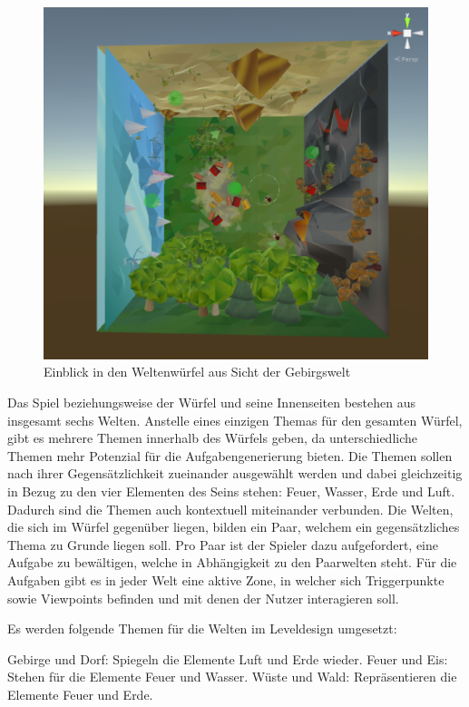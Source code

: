 
\begin{figure}[ht]%
	\centering
		\includegraphics[width=1.0\textwidth]{images/worlds}
	\caption{Einblick in den Weltenwürfel aus Sicht der Gebirgswelt}
	\label{fig:Worlds}
\end{figure}

Das Spiel beziehungsweise der Würfel und seine Innenseiten bestehen aus insgesamt sechs Welten. Anstelle eines einzigen Themas für den gesamten Würfel, gibt es mehrere Themen innerhalb des Würfels geben, da unterschiedliche Themen mehr Potenzial für die Aufgabengenerierung bieten. Die Themen sollen nach ihrer Gegensätzlichkeit zueinander ausgewählt werden und dabei gleichzeitig in Bezug zu den vier Elementen des Seins stehen: Feuer, Wasser, Erde und Luft. Dadurch sind die Themen auch kontextuell miteinander verbunden. Die Welten, die sich im Würfel gegenüber liegen, bilden ein Paar, welchem ein gegensätzliches Thema zu Grunde liegen soll. Pro Paar ist der Spieler dazu aufgefordert, eine Aufgabe zu bewältigen, welche in Abhängigkeit zu den Paarwelten steht. Für die Aufgaben gibt es in jeder Welt eine aktive Zone, in welcher sich Triggerpunkte sowie Viewpoints befinden und mit denen der Nutzer interagieren soll.

Es werden folgende Themen für die Welten im Leveldesign umgesetzt: 

Gebirge und Dorf: Spiegeln die Elemente Luft und Erde wieder. 
Feuer und Eis: Stehen für die Elemente Feuer und Wasser.
Wüste und Wald: Repräsentieren die Elemente Feuer und Erde.